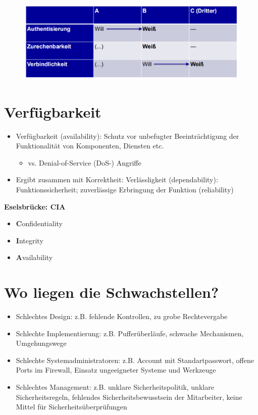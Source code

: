 \documentclass[openany]{book}
\begin{document}
\begin{figure}[h!]
\centering
\includegraphics[width=\linewidth]{Pics/Authenticity3rdParty.PNG}
\end{figure}

\newpage

\section{Verfügbarkeit}

\begin{itemize}
\item Verfügbarkeit (availability): Schutz vor unbefugter Beeinträchtigung der Funktionalität von Komponenten, Diensten etc.
\begin{itemize}
\item vs. Denial-of-Service (DoS-) Angriffe
\end{itemize}
\item Ergibt zusammen mit Korrektheit: Verlässligkeit (dependability): Funktionssicherheit; zuverlässige Erbringung der Funktion (reliability)
\end{itemize}

\textbf{Eselsbrücke: CIA}
\begin{itemize}
\item \textbf{C}onfidentiality
\item \textbf{I}ntegrity
\item \textbf{A}vailability
\end{itemize}

\section{Wo liegen die Schwachstellen?}

\begin{itemize}
\item Schlechtes Design: z.B. fehlende Kontrollen, zu grobe Rechtevergabe
\item Schlechte Implementierung: z.B. Pufferüberläufe, schwache Mechanismen, Umgehungswege
\item Schlechte Systemadministratoren: z.B. Account mit Standartpasswort, offene Ports im Firewall, Einsatz ungeeigneter Systeme und Werkzeuge
\item Schlechtes Management: z.B. unklare Sicherheitspolitik, unklare Sicherheitsregeln, fehlendes Sicherheitsbewusstsein der Mitarbeiter, keine Mittel für Sicherheitsüberprüfungen
\end{itemize}
\end{document}
